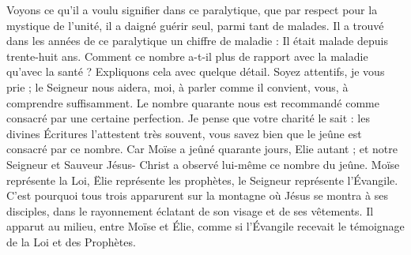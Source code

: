Voyons ce qu’il a voulu signifier dans ce paralytique, que par respect pour la mystique de l’unité, il a daigné guérir seul, parmi tant de malades. Il a trouvé dans les années de ce paralytique un chiffre de maladie : Il était malade depuis trente-huit ans. Comment ce nombre a-t-il plus de rapport avec la maladie qu’avec la santé ? Expliquons cela avec quelque détail. Soyez attentifs, je vous prie ; le Seigneur nous aidera, moi, à parler comme il convient, vous, à comprendre suffisamment. Le nombre quarante nous est recommandé comme consacré par une certaine perfection. Je pense que votre charité le sait : les divines Écritures l’attestent très souvent, vous savez bien que le jeûne est consacré par ce nombre. Car Moïse a jeûné quarante jours, Elie autant ; et notre Seigneur et Sauveur Jésus- Christ a observé lui-même ce nombre du jeûne. Moïse représente la Loi, Ëlie représente les prophètes, le Seigneur représente l’Évangile. C’est pourquoi tous trois apparurent sur la montagne où Jésus se montra à ses disciples, dans le rayonnement éclatant de son visage et de ses vêtements. Il apparut au milieu, entre Moïse et Élie, comme si l’Évangile recevait le témoignage de la Loi et des Prophètes.
